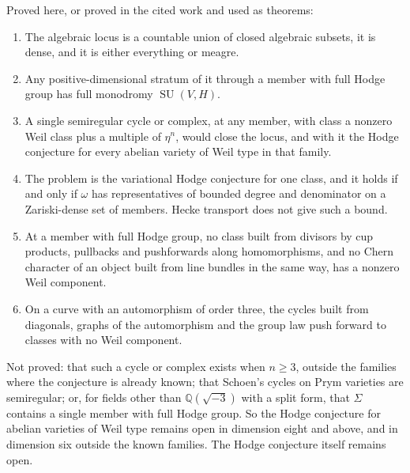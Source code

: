 \documentclass[11pt]{amsart}
\theoremstyle{definition}
\theoremstyle{remark}
\newcommand{\QQ}{\mathbb{Q}}
\newcommand{\SU}{\operatorname{SU}}
\begin{document}
Proved here, or proved in the cited work and used as theorems:
\begin{enumerate}[label=(\arabic*)]
\item The algebraic locus is a countable union of closed algebraic
subsets, it is dense, and it is either everything or meagre.
\item Any positive-dimensional stratum of it through a member with full
Hodge group has full monodromy $\SU(V,H)$.
\item A single semiregular cycle or complex, at any member, with class a
nonzero Weil class plus a multiple of $\eta^{n}$, would close the locus,
and with it the Hodge conjecture for every abelian variety of Weil type in
that family.
\item The problem is the variational Hodge conjecture for one class, and it
holds if and only if $\omega$ has representatives of bounded degree and
denominator on a Zariski-dense set of members. Hecke transport does not
give such a bound.
\item At a member with full Hodge group, no class built from divisors by
cup products, pullbacks and pushforwards along homomorphisms, and no Chern
character of an object built from line bundles in the same way, has a
nonzero Weil component.
\item On a curve with an automorphism of order three, the cycles built
from diagonals, graphs of the automorphism and the group law push forward
to classes with no Weil component.
\end{enumerate}
Not proved: that such a cycle or complex exists when $n\ge3$, outside the
families where the conjecture is already known; that Schoen's cycles on
Prym varieties are semiregular; or, for fields other than
$\QQ(\sqrt{-3})$ with a split form, that $\Sigma$ contains a single
member with full Hodge group. So the Hodge conjecture for abelian varieties
of Weil type remains open in dimension eight and above, and in dimension
six outside the known families. The Hodge conjecture itself remains open.
\end{document}
